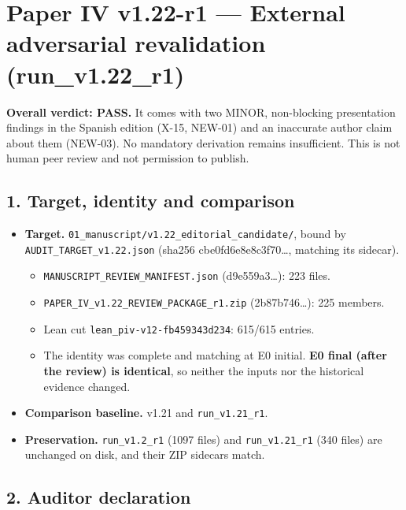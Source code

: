\documentclass[
]{article}
\author{}
\date{}
\providecommand{\tightlist}{%
  \setlength{\itemsep}{0pt}\setlength{\parskip}{0pt}}
\begin{document}
\section{Paper IV v1.22-r1 --- External adversarial revalidation
(run\_v1.22\_r1)}\label{paper-iv-v122-r1--external-adversarial-revalidation-run_v122_r1}

\textbf{Overall verdict: PASS.} It comes with two MINOR, non-blocking
presentation findings in the Spanish edition (X-15, NEW-01) and an
inaccurate author claim about them (NEW-03). No mandatory derivation
remains insufficient. This is not human peer review and not permission
to publish.

\subsection{1. Target, identity and
comparison}\label{1-target-identity-and-comparison}

\begin{itemize}
\tightlist
\item
  \textbf{Target.} \texttt{01\_manuscript/v1.22\_editorial\_candidate/},
  bound by \texttt{AUDIT\_TARGET\_v1.22.json} (sha256
  cbe0fd6e8e8c3f70\ldots, matching its sidecar).

  \begin{itemize}
  \tightlist
  \item
    \texttt{MANUSCRIPT\_REVIEW\_MANIFEST.json} (d9e559a3\ldots): 223
    files.
  \item
    \texttt{PAPER\_IV\_v1.22\_REVIEW\_PACKAGE\_r1.zip} (2b87b746\ldots):
    225 members.
  \item
    Lean cut \texttt{lean\_piv-v12-fb459343d234}: 615/615 entries.
  \item
    The identity was complete and matching at E0 initial. \textbf{E0
    final (after the review) is identical}, so neither the inputs nor
    the historical evidence changed.
  \end{itemize}
\item
  \textbf{Comparison baseline.} v1.21 and \texttt{run\_v1.21\_r1}.
\item
  \textbf{Preservation.} \texttt{run\_v1.2\_r1} (1097 files) and
  \texttt{run\_v1.21\_r1} (340 files) are unchanged on disk, and their
  ZIP sidecars match.
\end{itemize}

\subsection{2. Auditor declaration}\label{2-auditor-declaration}
\end{document}
